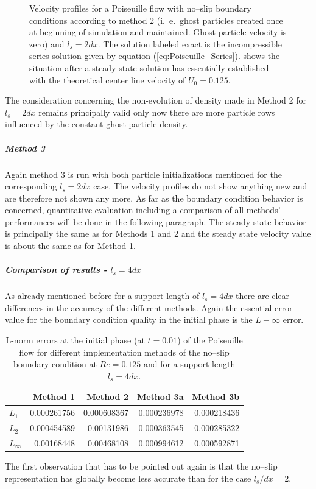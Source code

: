 \documentclass{report}
\begin{document}
\begin{figure}[!htbp]
\caption[Velocity profiles Poiseuille flow]{Velocity profiles for a Poiseuille flow with no--slip boundary conditions according to method 2 (i.\ e.\ ghost particles created once at beginning of simulation and maintained. Ghost particle velocity is zero) and $l_s=2dx$. The solution labeled exact is the incompressible series solution given by equation (\ref{eq:Poiseuille_Series}).   shows the situation after a steady-state solution has essentially established with the theoretical center line velocity of $U_0=0.125$.}

\end{figure}


The consideration concerning the non-evolution of density made in Method 2 for $l_s=2dx$ remains principally valid only now there are more particle rows influenced by the constant ghost particle density.

\subparagraph{Method 3}
Again method 3 is run with both particle initializations mentioned for the corresponding $l_s=2dx$ case. The velocity profiles do not show anything new and are therefore not shown any more. As far as the boundary condition behavior is concerned, quantitative evaluation including a comparison of all methods' performances will be done in the following paragraph. The steady state behavior is principally the same as for Methods 1 and 2 and the steady state velocity value is about the same as for Method 1.


\subparagraph{Comparison of results - $l_s=4dx$}

As already mentioned before for a support length of $l_s=4dx$ there are clear differences in the accuracy of the different methods. Again the essential error value for the boundary condition quality in the initial phase is the $L-\infty$ error.  
 
\begin{table}[h] %
\label{tab:2DSPH_LinearWall_Poiseuille_Errors_t0_01}
\centering
\begin{tabular}[c]{||l||r|r|r|r||} %
\hline
\hline
 &{\bf Method 1} & {\bf Method 2} & {\bf Method 3a}& {\bf Method 3b}\\
\hline
\hline
$L_1$&0.000261756 & 0.000608367 & 0.000236978& 0.000218436\\
\hline
$L_2$&0.000454589 & 0.00131986 & 0.000363545& 0.000285322 \\
\hline
$L_\infty$&0.00168448  & 0.00468108 & 0.000994612& 0.000592871\\
\hline
\hline
\end{tabular}

  \caption[]{L-norm errors at the initial phase (at $t=0.01$) of the Poiseuille flow 
for different implementation methods of the no--slip boundary condition at $Re=0.125$ and for a support length $l_s=4dx$.}
\end{table}
The first observation that has to be pointed out again is that the no--slip representation has globally become less accurate than for the case $l_s/dx=2$. 
\end{document}
